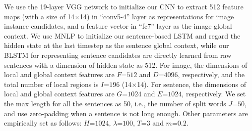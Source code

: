 \documentclass[10pt,twocolumn,letterpaper]{article}
\begin{document}
We use the 19-layer VGG network \cite{simonyan2014very} to initialize
our CNN to extract 512 feature maps
(with a size of 14$\times$14) in ``conv5-4'' layer
as representations for image instance candidates,
and a feature vector in ``fc7'' layer as the image global context.
We use MNLP \cite{kiros2014unifying} to initialize our sentence-based LSTM
and regard the hidden state at the last timestep as the sentence global context,
while our BLSTM for representing sentence candidates are directly learned from raw sentences with a dimension of hidden state as 512.
For image, the dimensions of local and global context features are $F$=$512$ and $D$=$4096$, respectively,
and the total number of local regions is $I$=$196$ (14$\times$14).
For sentence, the dimensions of local and global context features are $G$=$1024$ and $E$=$1024$, respectively.
We set the max length for all the sentences as 50, i.e., the number of split words $J$=$50$,
and use zero-padding when a sentence is not long enough.
Other parameters are empirically set as follows:
$H$=$1024$, $\lambda$=$100$, $T$=$3$ and $m$=$0.2$.
\end{document}
